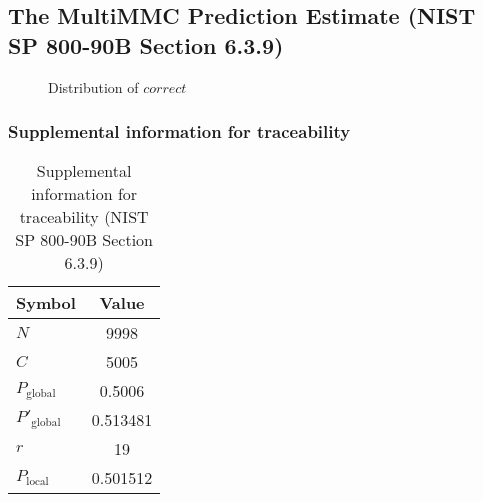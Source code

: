 \documentclass[a3paper,xelatex,english]{bxjsarticle}
\begin{document}
\subsection{The MultiMMC Prediction Estimate (NIST SP 800-90B Section 6.3.9)}
\begin{figure}[htbp]
\centering

\caption{Distribution of $correct$}
\end{figure}
\subsubsection{Supplemental information for traceability}
\renewcommand{\arraystretch}{1.8}
\begin{table}[h]
\caption{Supplemental information for traceability (NIST SP 800-90B Section 6.3.9)}
\begin{center}
\begin{tabular}{|l|c|}
\hline 
\rowcolor{anotherlightblue} %
Symbol				& Value \\ \hline 
$N$				& 9998\\ \hline 
$C$				& 5005\\ \hline 
$P_{\textrm{global}}$				&   0.5006\\ \hline 
$P'_{\textrm{global}}$			& 0.513481\\ \hline 
$r$				& 19\\ \hline 
$P_{\textrm{local}}$ 			& 0.501512\\ \hline
\end{tabular}
\end{center}
\end{table}
\renewcommand{\arraystretch}{1.4}
\clearpage
\end{document}
